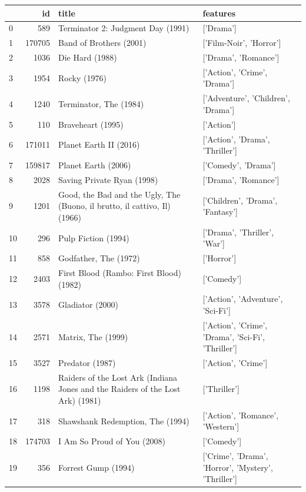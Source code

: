 
\begin{tabular}{lrll}
\toprule
 & id & title & features \\
\midrule
0 & 589 & Terminator 2: Judgment Day (1991) & ['Drama'] \\
1 & 170705 & Band of Brothers (2001) & ['Film-Noir', 'Horror'] \\
2 & 1036 & Die Hard (1988) & ['Drama', 'Romance'] \\
3 & 1954 & Rocky (1976) & ['Action', 'Crime', 'Drama'] \\
4 & 1240 & Terminator, The (1984) & ['Adventure', 'Children', 'Drama'] \\
5 & 110 & Braveheart (1995) & ['Action'] \\
6 & 171011 & Planet Earth II (2016) & ['Action', 'Drama', 'Thriller'] \\
7 & 159817 & Planet Earth (2006) & ['Comedy', 'Drama'] \\
8 & 2028 & Saving Private Ryan (1998) & ['Drama', 'Romance'] \\
9 & 1201 & Good, the Bad and the Ugly, The (Buono, il brutto, il cattivo, Il) (1966) & ['Children', 'Drama', 'Fantasy'] \\
10 & 296 & Pulp Fiction (1994) & ['Drama', 'Thriller', 'War'] \\
11 & 858 & Godfather, The (1972) & ['Horror'] \\
12 & 2403 & First Blood (Rambo: First Blood) (1982) & ['Comedy'] \\
13 & 3578 & Gladiator (2000) & ['Action', 'Adventure', 'Sci-Fi'] \\
14 & 2571 & Matrix, The (1999) & ['Action', 'Crime', 'Drama', 'Sci-Fi', 'Thriller'] \\
15 & 3527 & Predator (1987) & ['Action', 'Crime'] \\
16 & 1198 & Raiders of the Lost Ark (Indiana Jones and the Raiders of the Lost Ark) (1981) & ['Thriller'] \\
17 & 318 & Shawshank Redemption, The (1994) & ['Action', 'Romance', 'Western'] \\
18 & 174703 & I Am So Proud of You (2008) & ['Comedy'] \\
19 & 356 & Forrest Gump (1994) & ['Crime', 'Drama', 'Horror', 'Mystery', 'Thriller'] \\
\bottomrule
\end{tabular}
